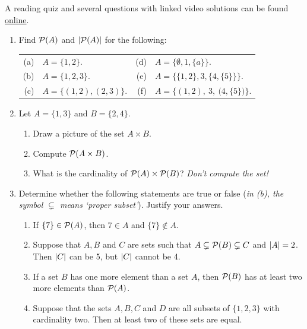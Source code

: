 \begin{exercises}{}{}
A reading quiz and several questions with linked video solutions can be found \href{http://www.math.uci.edu/~ndonalds/math13/selftest/6-2-power.html}{online}.

\begin{enumerate}
  \item Find $\mathcal{P}(A)$ and $\left| \mathcal{P}(A)\right|$ for the following:\\[5pt]
	\begin{tabular}{r@{\ \ }l@{\qquad\qquad\qquad\qquad}r@{\ \ }l}
	(a)&$A=\{1,2\}$.&(d)&$A=\{\emptyset,1,\{a\}\}$.\\[2pt]
	(b)&$A=\{1,2,3\}$.&(e)&$A=\Big\{\big\{1,2\big\},3,\big\{4,\{5\}\big\}\Big\}$.\\[5pt]
	(c)&$A=\bigl\{(1,2),(2,3)\bigr\}$.&(f)&$A=\Big\{(1,2),\ 3,\ \bigl(4,\{5\}\bigr)\Big\}$.
	\end{tabular}
	
	\item Let $A=\{1,3\}$ and $B=\{2,4\}$.
	\begin{enumerate}
	  \item Draw a picture of the set $A\times B$.
	  \item Compute $\mathcal{P}(A\times B)$.
	  \item What is the cardinality of $\mathcal{P}(A)\times\mathcal{P}(B)$? \emph{Don't compute the set!}
	\end{enumerate}
  
	\item Determine whether the following statements are true or false (\emph{in (b), the symbol $\subsetneq$ means `proper subset'}). Justify your answers.
  \begin{enumerate}
    \item If $\{7\}\in\mathcal{P}(A)$, then $7\in A$ and $\{7\}\notin A$.
    \item Suppose that $A,B$ and $C$ are sets such that $A\subsetneq\mathcal{P}(B)\subsetneq C$ and $\left| A\right|=2$. Then $\left| C\right|$ can be 5, but $\left| C\right|$ cannot be 4.
    \item If a set $B$ has one more element than a set $A$, then $\mathcal{P}(B)$ has at least two more elements than $\mathcal{P}(A)$.
    \item Suppose that the sets $A,B,C$ and $D$ are all subsets of $\{1,2,3\}$ with cardinality two. Then at least two of these sets are equal. 
  \end{enumerate}
  

\end{enumerate}
\end{exercises}
